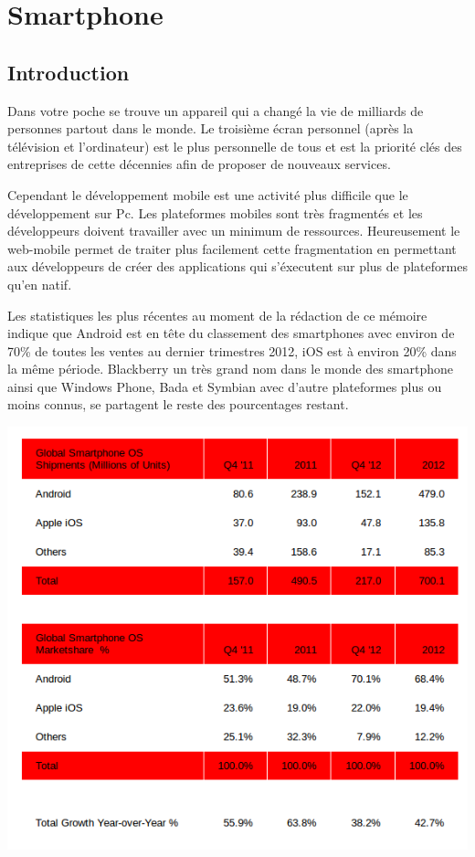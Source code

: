 \chapter{Smartphone}
\label{ch:smartphone}

\section*{Introduction}

Dans votre poche se trouve un appareil qui a changé la vie de milliards de personnes partout dans le monde. Le troisième écran personnel (après la télévision et l’ordinateur) est le plus personnelle de tous et est la priorité clés des entreprises de cette décennies afin de proposer de nouveaux services.

Cependant le développement mobile est une activité plus difficile que le développement sur Pc. Les plateformes mobiles sont très fragmentés et les développeurs doivent travailler avec un minimum de ressources. Heureusement le web-mobile permet de traiter plus facilement cette fragmentation en permettant aux développeurs de créer des applications qui s’éxecutent sur plus de plateformes qu’en natif.

Les statistiques les plus récentes au moment de la rédaction de ce mémoire indique que Android est en tête du classement des smartphones avec environ de 70\% de toutes les ventes au dernier trimestres 2012, iOS est à environ 20\% dans la même période. Blackberry un très grand nom dans le monde des smartphone ainsi que Windows Phone, Bada et Symbian avec d’autre plateformes plus ou moins connus, se partagent le reste des pourcentages restant.


\begin{center}
\includegraphics[width=14cm]{img/marche_smartphone.png}
\label{Parts de marché smartphone}
\end{center}

